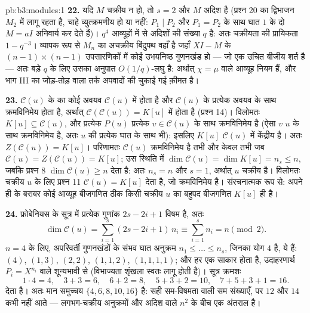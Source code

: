 \begin{solution}{pb:b3:modules:1}
\textbf{22.} यदि $M$ चक्रीय न हो, तो $s = 2$ और $M$ अदिश है
(प्रश्न 20 का द्विभाजन $M_2$ में लागू रहता है, चाहे व्युत्क्रमणीय
हो या नहीं: $P_1 \mid P_2$ और $P_1 =
P_2$ के साथ घात $1$ के दो 
$M = aI$ अनिवार्य कर देते हैं)। $q^4$ आव्यूहों में से अदिशों की संख्या
$q$ है: अतः चक्रीयता की प्रायिकता $1 - q^{-3}$। व्यापक रूप से $M_n$ का
अचक्रीय बिंदुपथ वहाँ है जहाँ $XI - M$ के $(n-1)\times(n-1)$ उपसारणिकों में कोई
उभयनिष्ठ गुणनखंड हो --- जो एक उचित बीजीय शर्त है --- अतः बड़े $q$
के लिए उसका अनुपात $O(1/q)$-लघु है: अर्थात् $\chi = \mu$ वाले आव्यूह नियम हैं,
और भाग III का जोड़-तोड़ वाला तर्क अपवादों की चुकाई गई क़ीमत है।

\textbf{23.} $\mathcal C(u)$ के  का कोई अवयव $\mathcal C(u)$ में होता है और $\mathcal C(u)$
के प्रत्येक अवयव के साथ क्रमविनिमेय होता है, अर्थात् $\mathcal C(\mathcal C(u)) =
K[u]$ में होता
है (प्रश्न 14)। विलोमतः $K[u] \subseteq \mathcal C(u)$, और प्रत्येक $P(u)$ प्रत्येक $v \in \mathcal C(u)$ के
साथ क्रमविनिमेय है (ऐसा $v$ $u$ के साथ क्रमविनिमेय है, अतः $u$
की प्रत्येक घात के साथ भी): इसलिए $K[u]$ $\mathcal C(u)$ में केंद्रीय है। अतः
$Z(\mathcal C(u))
= K[u]$। परिणामतः $\mathcal C(u)$ क्रमविनिमेय है तभी और केवल तभी जब $\mathcal C(u) = Z(\mathcal C(u)) = K[u]$; उस
स्थिति में $\dim\mathcal C(u) = \dim K[u] = n_s \leq n$, जबकि प्रश्न 8 $\dim\mathcal C(u) \geq n$ देता है: अतः $n_s = n$ और $s = 1$,
अर्थात् $u$ चक्रीय है। विलोमतः चक्रीय $u$ के लिए प्रश्न 11 $\mathcal C(u) = K[u]$
देता है, जो क्रमविनिमेय है। संरचनात्मक रूप से: अपने ही  के
बराबर कोई आव्यूह बीजगणित ठीक किसी चक्रीय $u$ का बहुपद बीजगणित
$K[u]$ ही है।

\textbf{24.} फ्रोबेनियस के सूत्र में प्रत्येक गुणांक $2s - 2i + 1$ विषम है,
अतः
\[
\dim\mathcal C(u) = \sum_{i=1}^s(2s - 2i + 1)\,n_i
\equiv \sum_{i=1}^s n_i = n \pmod 2 .
\]
$n = 4$ के लिए, अपरिवर्ती गुणनखंडों के संभव घात अनुक्रम $n_1 \leq \dots
\leq n_s$, जिनका
योग $4$ है, ये हैं: $(4)$, $(1, 3)$, $(2, 2)$, $(1, 1, 2)$, $(1, 1, 1, 1)$; और हर एक
साकार होता है, उदाहरणार्थ $P_i = X^{n_i}$ वाले शून्यभावी से (विभाज्यता शृंखला
स्वतः लागू होती है)। सूत्र क्रमशः
\[
1\cdot4 = 4, \quad 3 + 3 = 6, \quad 6 + 2 = 8, \quad
5 + 3 + 2 = 10, \quad 7 + 5 + 3 + 1 = 16 .
\]
देता है। अतः मान समुच्चय $\{4, 6, 8, 10, 16\}$ है: सही सम-विषमता वाली सम संख्याएँ,
पर $12$ और $14$ कभी नहीं आते --- लगभग-चक्रीय अनुक्रमों और अदिश
वाले $n^2$ के बीच एक अंतराल है।


\end{solution}
